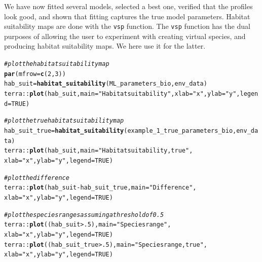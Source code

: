 \documentclass[11pt]{article}\usepackage[]{graphicx}\usepackage[]{xcolor}
\makeatletter
\newcommand{\hlnum}[1]{\textcolor[rgb]{0.686,0.059,0.569}{#1}}%
\newcommand{\hlsng}[1]{\textcolor[rgb]{0.192,0.494,0.8}{#1}}%
\newcommand{\hlcom}[1]{\textcolor[rgb]{0.678,0.584,0.686}{\textit{#1}}}%
\newcommand{\hlopt}[1]{\textcolor[rgb]{0,0,0}{#1}}%
\newcommand{\hldef}[1]{\textcolor[rgb]{0.345,0.345,0.345}{#1}}%
\newcommand{\hlkwb}[1]{\textcolor[rgb]{0.69,0.353,0.396}{#1}}%
\newcommand{\hlkwc}[1]{\textcolor[rgb]{0.333,0.667,0.333}{#1}}%
\newcommand{\hlkwd}[1]{\textcolor[rgb]{0.737,0.353,0.396}{\textbf{#1}}}%
\newenvironment{kframe}{%
 \def\at@end@of@kframe{}%
 \ifinner\ifhmode%
  \def\at@end@of@kframe{\end{minipage}}%
  \begin{minipage}{\columnwidth}%
 \fi\fi%
 \def\FrameCommand##1{\hskip\@totalleftmargin \hskip-\fboxsep
 \colorbox{shadecolor}{##1}\hskip-\fboxsep
     \hskip-\linewidth \hskip-\@totalleftmargin \hskip\columnwidth}%
 \MakeFramed {\advance\hsize-\width
   \@totalleftmargin\z@ \linewidth\hsize
   \@setminipage}}%
 {\par\unskip\endMakeFramed%
 \at@end@of@kframe}
\newenvironment{knitrout}{}{} %
\makeatother
\begin{document}
We have now fitted several models, selected a best one, verified that the profiles 
look good, and shown that fitting captures the true model parameters. 
Habitat suitability maps are done with 
the \texttt{vsp} function. The \texttt{vsp} function has the dual purposes of 
allowing the user to experiment with creating virtual species, and producing 
habitat suitability maps. We here use it for the latter.
\begin{knitrout}
\color{fgcolor}\begin{kframe}
\begin{alltt}
\hlcom{#plot the habitat suitability map}
\hlkwd{par}\hldef{(}\hlkwc{mfrow}\hldef{=}\hlkwd{c}\hldef{(}\hlnum{2}\hldef{,}\hlnum{3}\hldef{))}
\hldef{hab_suit} \hlkwb{=} \hlkwd{habitat_suitability}\hldef{(ML_parameters_bio,env_data)}
\hldef{terra}\hlopt{::}\hlkwd{plot}\hldef{(hab_suit,}\hlkwc{main}\hldef{=}\hlsng{"Habitat suitability"}\hldef{,}\hlkwc{xlab}\hldef{=}\hlsng{"x"}\hldef{,}\hlkwc{ylab}\hldef{=}\hlsng{"y"}\hldef{,}\hlkwc{legend}\hldef{=}\hlnum{TRUE}\hldef{)}

\hlcom{#plot the true habitat suitability map}
\hldef{hab_suit_true} \hlkwb{=} \hlkwd{habitat_suitability}\hldef{(example_1_true_parameters_bio,env_data)}
\hldef{terra}\hlopt{::}\hlkwd{plot}\hldef{(hab_suit,}\hlkwc{main}\hldef{=}\hlsng{"Habitat suitability, true"}\hldef{,}
            \hlkwc{xlab}\hldef{=}\hlsng{"x"}\hldef{,}\hlkwc{ylab}\hldef{=}\hlsng{"y"}\hldef{,}\hlkwc{legend}\hldef{=}\hlnum{TRUE}\hldef{)}

\hlcom{#plot the difference}
\hldef{terra}\hlopt{::}\hlkwd{plot}\hldef{(hab_suit}\hlopt{-}\hldef{hab_suit_true,}\hlkwc{main}\hldef{=}\hlsng{"Difference"}\hldef{,}
            \hlkwc{xlab}\hldef{=}\hlsng{"x"}\hldef{,}\hlkwc{ylab}\hldef{=}\hlsng{"y"}\hldef{,}\hlkwc{legend}\hldef{=}\hlnum{TRUE}\hldef{)}

\hlcom{#plot the species ranges assuming a threshold of 0.5}
\hldef{terra}\hlopt{::}\hlkwd{plot}\hldef{((hab_suit}\hlopt{>}\hlnum{.5}\hldef{),}\hlkwc{main}\hldef{=}\hlsng{"Species range"}\hldef{,}
            \hlkwc{xlab}\hldef{=}\hlsng{"x"}\hldef{,}\hlkwc{ylab}\hldef{=}\hlsng{"y"}\hldef{,}\hlkwc{legend}\hldef{=}\hlnum{TRUE}\hldef{)}
\hldef{terra}\hlopt{::}\hlkwd{plot}\hldef{((hab_suit_true}\hlopt{>}\hlnum{.5}\hldef{),}\hlkwc{main}\hldef{=}\hlsng{"Species range, true"}\hldef{,}
            \hlkwc{xlab}\hldef{=}\hlsng{"x"}\hldef{,}\hlkwc{ylab}\hldef{=}\hlsng{"y"}\hldef{,}\hlkwc{legend}\hldef{=}\hlnum{TRUE}\hldef{)}


\end{alltt}
\end{kframe}
\end{knitrout}
\end{document}
